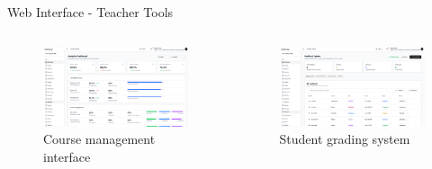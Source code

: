 \documentclass[aspectratio=169]{beamer}
\begin{document}
\begin{frame}{Web Interface - Teacher Tools}
    \begin{columns}
        \begin{figure}
            \includegraphics[width=\textwidth,height=0.55\textheight,keepaspectratio]{../pfe-pics/teacher/Screenshot 2025-06-09 at 22-55-38 Vite React TS.png}
            \caption{Course management interface}
        \end{figure}
        \begin{figure}
            \includegraphics[width=\textwidth,height=0.55\textheight,keepaspectratio]{../pfe-pics/teacher/Screenshot 2025-06-09 at 22-56-28 Vite React TS.png}
            \caption{Student grading system}
        \end{figure}
    \end{columns}
\end{frame}
\end{document}
